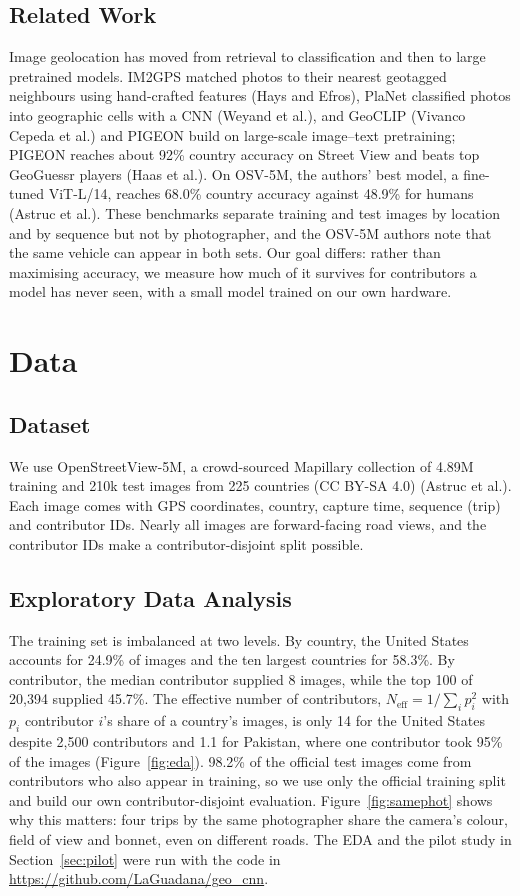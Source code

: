 \documentclass[clean,twocolumn]{bam-project}
\begin{document}
\subsection{Related Work}
Image geolocation has moved from retrieval to classification and then to large pretrained models.
IM2GPS matched photos to their nearest geotagged neighbours using hand-crafted features (Hays and
Efros), PlaNet classified photos into geographic cells with a CNN (Weyand et al.), and GeoCLIP
(Vivanco Cepeda et al.) and PIGEON build on large-scale image--text pretraining; PIGEON reaches about
92\% country accuracy on Street View and beats top GeoGuessr players (Haas et al.). On OSV-5M, the
authors' best model, a fine-tuned ViT-L/14, reaches 68.0\% country accuracy against 48.9\% for humans
(Astruc et al.). These benchmarks separate training and test images by location and by sequence but
not by photographer, and the OSV-5M authors note that the same vehicle can appear in both sets. Our
goal differs: rather than maximising accuracy, we measure how much of it survives for contributors a
model has never seen, with a small model trained on our own hardware.

\section{Data}
\subsection{Dataset}
We use OpenStreetView-5M, a crowd-sourced Mapillary collection of 4.89M training and 210k test images
from 225 countries (CC BY-SA 4.0) (Astruc et al.). Each image comes with GPS coordinates, country,
capture time, sequence (trip) and contributor IDs. Nearly all images are forward-facing road views, and
the contributor IDs make a contributor-disjoint split possible.

\subsection{Exploratory Data Analysis}
The training set is imbalanced at two levels. By country, the United States accounts for 24.9\% of
images and the ten largest countries for 58.3\%. By contributor, the median contributor supplied 8
images, while the top 100 of 20{,}394 supplied 45.7\%. The effective number of contributors,
$N_{\text{eff}}=1/\sum_i p_i^2$ with $p_i$ contributor $i$'s share of a country's images, is only 14 for the
United States despite 2{,}500 contributors and 1.1 for Pakistan, where one contributor took 95\% of the
images (Figure~\ref{fig:eda}). 98.2\% of the official test images come from contributors who also appear
in training, so we use only the official training split and build our own contributor-disjoint
evaluation. Figure~\ref{fig:samephot} shows why this matters: four trips by the same photographer share
the camera's colour, field of view and bonnet, even on different roads. The EDA and the pilot study in Section~\ref{sec:pilot} were run with the code in
\url{https://github.com/LaGuadana/geo_cnn}.
\end{document}
